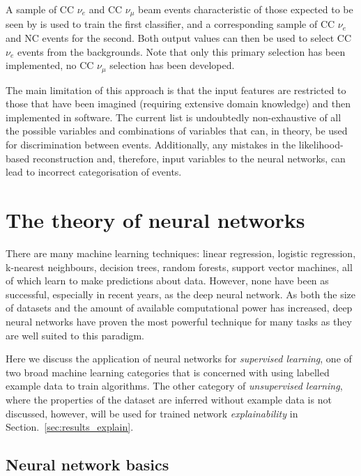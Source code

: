A sample of CC $\nu_{e}$ and CC $\nu_{\mu}$ beam events characteristic of those expected to be
seen by \chips is used to train the first classifier, and a corresponding sample of CC $\nu_{e}$
and NC events for the second. Both output values can then be used to select CC $\nu_{e}$ events
from the backgrounds. Note that only this primary selection has been implemented, no CC
$\nu_{\mu}$ selection has been developed.

The main limitation of this approach is that the input features are restricted to those that have
been imagined (requiring extensive domain knowledge) and then implemented in software. The current
list is undoubtedly non-exhaustive of all the possible variables and combinations of variables
that can, in theory, be used for discrimination between events. Additionally, any mistakes in the
likelihood-based reconstruction and, therefore, input variables to the neural networks, can lead
to incorrect categorisation of events.

\section{The theory of neural networks} %
\label{sec:cnn_theory} %

There are many machine learning techniques: linear regression, logistic regression, k-nearest
neighbours, decision trees, random forests, support vector machines, all of which learn to make
predictions about data. However, none have been as successful, especially in recent years, as the
deep neural network. As both the size of datasets and the amount of available computational power
has increased, deep neural networks have proven the most powerful technique for many tasks as they
are well suited to this paradigm.

Here we discuss the application of neural networks for \emph{supervised learning}, one of two
broad machine learning categories that is concerned with using labelled example data to train
algorithms. The other category of \emph{unsupervised learning}, where the properties of the
dataset are inferred without example data is not discussed, however, will be used for trained
network \emph{explainability} in Section.~\ref{sec:results_explain}.

\subsection{Neural network basics} %
\label{sec:cnn_theory_basics} %

